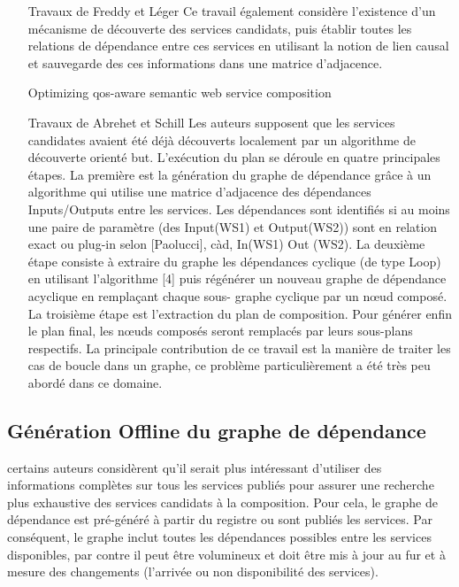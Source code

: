 \begin{itemize}
    \item [Travaux de Freddy et Léger\cite{lecue2006formal}] Ce travail
      également considère l'existence d'un mécanisme de découverte des
      services candidats, puis établir toutes les relations de
      dépendance entre ces services en utilisant la notion de lien
      causal et sauvegarde des ces informations dans une matrice
      d'adjacence.

      Optimizing qos-aware semantic web service composition
      \cite{lecue2009optimizing}

    \item[Travaux de Abrehet et Schill \cite{omer2009dependency}] Les
      auteurs supposent que les services candidates avaient été déjà
      découverts localement par un algorithme de découverte orienté
      but. L'exécution du plan se déroule en quatre principales
      étapes. La première est la génération du graphe de dépendance
      grâce à un algorithme qui utilise une matrice d'adjacence des
      dépendances Inputs/Outputs entre les services. Les dépendances
      sont identifiés si au moins une paire de paramètre (des
      Input(WS1) et Output(WS2)) sont en relation exact ou plug-in
      selon [Paolucci], càd, In(WS1) Out (WS2). La deuxième étape
      consiste à extraire du graphe les dépendances cyclique (de type
      Loop) en utilisant l'algorithme [4] puis régénérer un nouveau
      graphe de dépendance acyclique en remplaçant chaque sous- graphe
      cyclique par un nœud composé. La troisième étape est
      l'extraction du plan de composition. Pour générer enfin le plan
      final, les nœuds composés seront remplacés par leurs sous-plans
      respectifs.  La principale contribution de ce travail est la
      manière de traiter les cas de boucle dans un graphe, ce problème
      particulièrement a été très peu abordé dans ce domaine.
  \end{itemize}

  \subsection{Génération Offline du graphe de dépendance}
  \label{sec:gener-offline}
  certains auteurs considèrent qu'il serait plus intéressant
  d'utiliser des informations complètes sur tous les services publiés
  pour assurer une recherche plus exhaustive des services candidats à
  la composition. Pour cela, le graphe de dépendance est pré-généré à
  partir du registre ou sont publiés les services. Par conséquent, le
  graphe inclut toutes les dépendances possibles entre les services
  disponibles, par contre il peut être volumineux et doit être mis à
  jour au fur et à mesure des changements (l'arrivée ou non
  disponibilité des services).

